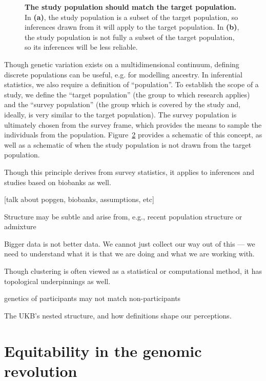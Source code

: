 \begin{figure}[h]
\begin{subfigure}{0.45\linewidth}
    \caption{}
    \label{fig:statistical_populations2}
\end{subfigure}
\caption[The relationship between target and study populations]{\textbf{The study population should match the target population.} In \textbf{(a)}, the study population is a subset of the target population, so inferences drawn from it will apply to the target population. In \textbf{(b)}, the study population is not fully a subset of the target population, so its inferences will be less reliable.}
\label{fig:statistical_populations}
\end{figure}

Though genetic variation exists on a multidimensional continuum, defining discrete populations can be useful, e.g. for modelling ancestry\citep{pritchard_inference_2000}. In inferential statistics, we also require a definition of ``population''\citep{statcan2003}. To establish the scope of a study, we define the ``target population'' (the group to which research applies) and the ``survey population'' (the group which is covered by the study and, ideally, is very similar to the target population). The survey population is ultimately chosen from the survey frame, which provides the means to sample the individuals from the population. Figure~\ref{fig:statistical_populations} provides a schematic of this concept, as well as a schematic of when the study population is not drawn from the target population.

Though this principle derives from survey statistics, it applies to inferences and studies based on biobanks as well.

[talk about popgen, biobanks, assumptions, etc]


Structure may be subtle and arise from, e.g., recent population structure or admixture\citep{gopalan_human_2022}

Bigger data is not better data. We cannot just collect our way out of this --- we need to understand what it is that we are doing and what we are working with.



Though clustering is often viewed as a statistical or computational method, it has topological underpinnings as well.

genetics of participants may not match non-participants
\citep{benonisdottir_studying_2023}

The UKB's nested structure, and how definitions shape our perceptions.


\section{Equitability in the genomic revolution}

